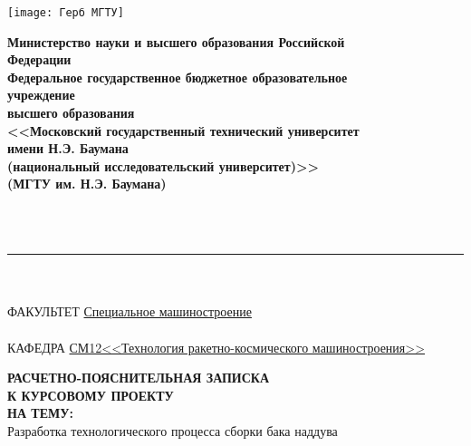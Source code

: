 \begin{minipage}{0.2\linewidth}
    \texttt{[image: Герб МГТУ]}
\end{minipage}
\begin{minipage}{0.8\linewidth}
    \begin{center}
        \begin{singlespace}
            \textbf{Министерство науки и высшего образования Российской \\ Федерации \\ Федеральное государственное бюджетное образовательное \\ учреждение \\ высшего образования \\ <<Московский государственный технический университет \\ имени Н.Э. Баумана \\ (национальный исследовательский университет)>> \\ (МГТУ им. Н.Э. Баумана)}
        \end{singlespace}
    \end{center}
\end{minipage}
\\
\\
\rule{\linewidth}{2pt} %
\\
\\
ФАКУЛЬТЕТ \underline{\hspace{0.25\linewidth} Специальное машиностроение \hspace{0.25\linewidth}}
\\
\\
КАФЕДРА \underline{\hspace{0.1\linewidth} СМ12<<Технология ракетно-космического машиностроения>> \hspace{0.1\linewidth}}
\\
\vspace{2.5cm}
\begin{center}
    \begin{minipage}{0.8\linewidth}
        \begin{center}
            \Large \textbf{ РАСЧЕТНО-ПОЯСНИТЕЛЬНАЯ ЗАПИСКА \\ К КУРСОВОМУ ПРОЕКТУ \\ НА ТЕМУ:}
            \\[10pt]
            \large Разработка технологического процесса сборки бака наддува
        \end{center}
    \end{minipage}
\end{center}
